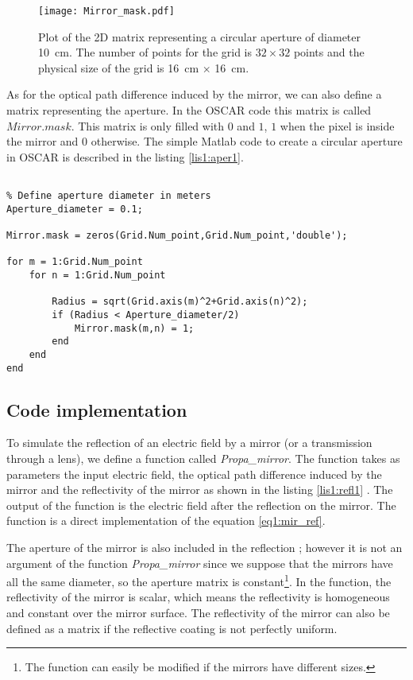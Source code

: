 
\begin{figure}
\begin{center}
\texttt{[image: Mirror\_mask.pdf]}
\end{center}
\caption{\label{fig1:aperture} Plot of the 2D matrix representing a circular aperture of diameter 10~cm. The number of points for the grid is $32 \times 32$ points and the physical size of the grid is 16~cm $\times$ 16~cm.}
\end{figure}

As for the optical path difference induced by the mirror, we can also define a matrix representing the aperture. In the OSCAR code this matrix is called $Mirror.mask$. This matrix is only filled with $0$ and $1$, $1$ when the pixel is inside the mirror and $0$ otherwise. The simple Matlab code to create a circular aperture in OSCAR is described in the listing \ref{lis1:aper1}.\\

\begin{lstlisting}[float=htp,caption=The code used to create a circular aperture \label{lis1:aper1},frame=lines]

% Define aperture diameter in meters
Aperture_diameter = 0.1;

Mirror.mask = zeros(Grid.Num_point,Grid.Num_point,'double');

for m = 1:Grid.Num_point
    for n = 1:Grid.Num_point

        Radius = sqrt(Grid.axis(m)^2+Grid.axis(n)^2);
        if (Radius < Aperture_diameter/2)
            Mirror.mask(m,n) = 1;
        end
    end
end

\end{lstlisting}

\subsection{Code implementation}
\label{sec1:3:5}
To simulate the reflection of an electric field by a mirror (or a transmission through a lens), we define a function called \emph{Propa\_mirror}. The function takes as parameters the input electric field, the optical path difference induced by the mirror and the reflectivity of the mirror as shown in the listing \ref{lis1:refl1} . The output of the function is the electric field after the reflection on the mirror. The function is a direct implementation of the equation \ref{eq1:mir_ref}.

The aperture of the mirror is also included in the reflection ; however it is not an argument of the function \emph{Propa\_mirror} since we suppose that the mirrors have all the same diameter, so the aperture matrix is constant\footnote{The function can easily be modified if the mirrors have different sizes.}. In the function, the reflectivity of the mirror is scalar, which means the reflectivity is homogeneous and constant over the mirror surface. The reflectivity of the mirror can also be defined as a matrix if the reflective coating is not perfectly uniform.

